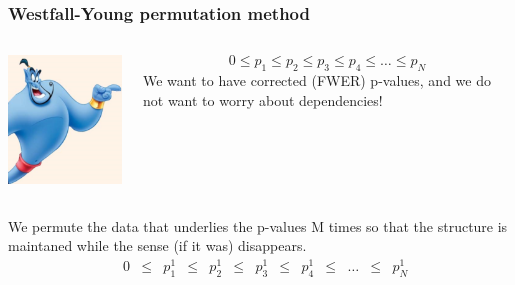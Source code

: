 \documentclass{beamer}
\begin{document}
	\begin{frame}
		\frametitle{Westfall-Young permutation method}
			\begin{minipage}[0.2\textheight]{\textwidth}
			\begin{columns}[T]
			\begin{column}{0.15\textwidth}
				\includegraphics[width=\textwidth]{djinn}
			\end{column}
			\begin{column}{0.85\textwidth}
				$$0 \leq p_1 \leq p_2 \leq p_3 \leq p_4 \leq \ldots \leq p_N$$
				We want to have corrected (FWER) p-values, and we do not want to worry about dependencies!
			\end{column}
			\end{columns}
			\end{minipage}
		\begin{center}
			We permute the data that underlies the p-values M times so that the structure is maintaned while the sense (if it was) disappears. 
				\tiny{\begin{align*}
				&0   & \leq &   p_1^1  & \leq &  p_2^1  & \leq &  p_3^1  & \leq &  p_4^1  & \leq &  \ldots  & \leq &  p_N^1 \\

\end{align*}}
\end{center}
\end{frame}
\end{document}
